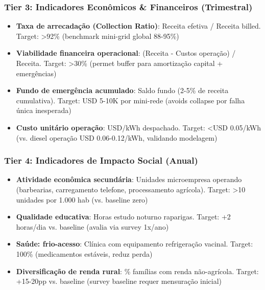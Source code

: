 \documentclass[12pt, a4paper]{article}
\begin{document}
\subsubsection{Tier 3: Indicadores Econômicos \& Financeiros (Trimestral)}
\begin{itemize}
\item \textbf{Taxa de arrecadação (Collection Ratio)}: Receita efetiva / Receita billed. Target: >92\% (benchmark mini-grid global 88-95\%)
\item \textbf{Viabilidade financeira operacional}: (Receita - Custos operação) / Receita. Target: >30\% (permet buffer para amortização capital + emergências)
\item \textbf{Fundo de emergência acumulado}: Saldo fundo (2-5\% de receita cumulativa). Target: USD 5-10K por mini-rede (avoids collapse por falha única inesperada)
\item \textbf{Custo unitário operação}: USD/kWh despachado. Target: <USD 0.05/kWh (vs. diesel operação USD 0.06-0.12/kWh, validando modelagem)
\end{itemize}

\subsubsection{Tier 4: Indicadores de Impacto Social (Anual)}
\begin{itemize}
\item \textbf{Atividade econômica secundária}: Unidades microempresa operando (barbearias, carregamento telefone, processamento agrícola). Target: >10 unidades por 1.000 hab (vs. baseline zero)
\item \textbf{Qualidade educativa}: Horas estudo noturno raparigas. Target: +2 horas/dia vs. baseline (avalia via survey 1x/ano)
\item \textbf{Saúde: frio-acesso}: Clínica com equipamento refrigeração vacinal. Target: 100\% (medicamentos estáveis, reduz perda)
\item \textbf{Diversificação de renda rural}: \% famílias com renda não-agrícola. Target: +15-20pp vs. baseline (survey baseline requer mensuração inicial)
\end{itemize}
\end{document}
